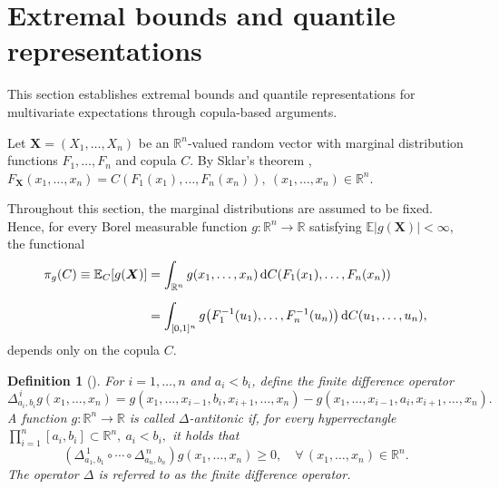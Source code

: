 \documentclass[12pt]{article}
\newtheorem{defi}[theo]{Definition}%
\begin{document}








\section{Extremal bounds and quantile representations} \label{sect:3}


This section establishes extremal bounds and quantile representations for multivariate expectations through copula-based arguments.

Let
$
\boldsymbol X=(X_1,\ldots,X_n)
$
be an $\mathbb R^n$-valued random vector with marginal distribution functions
$F_1,\ldots,F_n$ and copula $C$. By Sklar's theorem \citep{Sklar-1959},
$
F_{\boldsymbol X}(x_1,\ldots,x_n)
=
C\!\left(
F_1(x_1),\ldots,F_n(x_n)
\right),
\
(x_1,\ldots,x_n)\in\mathbb R^n.
$

Throughout this section, the marginal distributions are assumed to be fixed. Hence, for every Borel measurable function
$g:\mathbb R^n\to\mathbb R$ satisfying
$\mathbb E|g(\boldsymbol X)|<\infty$,
the functional
\begin{align}
	\pi_g(C)
	\equiv 
	\mathbb E_C[g(\boldsymbol X)]
	&=
	\int_{\mathbb R^n}
	g(x_1,\ldots,x_n)\,
	{\rm d}
	C\!\left(
	F_1(x_1),\ldots,F_n(x_n)
	\right)
	\nonumber
	\\[0.2cm]
	&=
	\int_{[0,1]^n}
	g\!\left(
	F_1^{-1}(u_1),\ldots,F_n^{-1}(u_n)
	\right)
	{\rm d}C(u_1,\ldots,u_n),
	\label{id-exp-cop}
\end{align}
depends only on the copula $C$.
\begin{defi}[\cite{Lux2017}]
	\label{antitonic-def}
	For $i=1,\ldots,n$ and $a_i<b_i$, define the finite difference operator
	\[
	\Delta^{\,i}_{a_i,b_i}
	g(x_1,\ldots,x_n)
	=
	g(x_1,\ldots,x_{i-1},b_i,x_{i+1},\ldots,x_n)
	-
	g(x_1,\ldots,x_{i-1},a_i,x_{i+1},\ldots,x_n).
	\]
	A function
	$g:\mathbb R^n\to\mathbb R$
	is called
	\emph{$\Delta$-antitonic}
	if, for every hyperrectangle
	$
	\prod_{i=1}^{n}[a_i,b_i]
	\subset
	\mathbb R^n,
	\
	a_i<b_i,
	$
	it holds that
	\[
	\left(
	\Delta^{\,1}_{a_1,b_1}
	\circ
	\cdots
	\circ
	\Delta^{\,n}_{a_n,b_n}
	\right)
	g(x_1,\ldots,x_n)
	\geqslant0,
	\quad
	\forall\,
	(x_1,\ldots,x_n)\in\mathbb R^n.
	\]
	The operator
	$\Delta$
	is referred to as the
	finite difference operator.
\end{defi}
\end{document}
